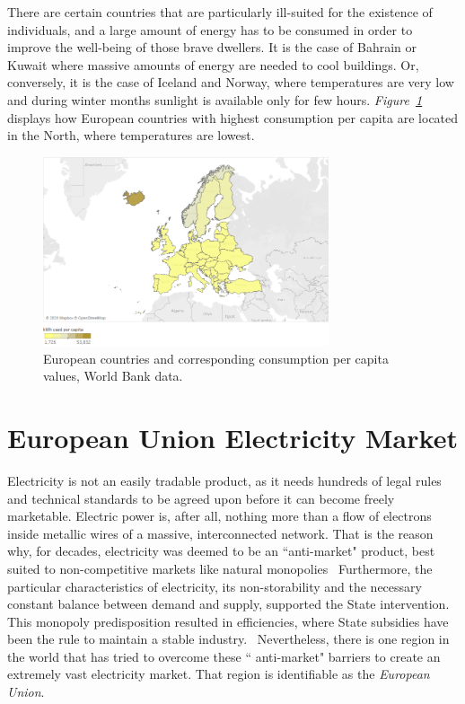 \documentclass[a4paper,12pt]{book}
\begin{document}
There are certain countries that are particularly ill-suited for the existence of individuals, and a large amount of energy has to be consumed in order to improve the well-being of those brave dwellers. It is the case of Bahrain or Kuwait where massive amounts of energy are needed to cool buildings. Or, conversely, it is the case of Iceland and Norway, where temperatures are very low and during winter months sunlight is available only for few hours. \textit{Figure~\ref{fig:conspc}} displays how European countries with highest consumption per capita are located in the North, where temperatures are lowest.

\begin{figure}[tb]
\begin{center}
\captionsetup{justification=centering}
\includegraphics[width=0.75\textwidth]{Images/cons.png}
\caption{European countries and corresponding consumption per capita values, World Bank data. }
\label{fig:conspc}
\end{center}
\end{figure}

\section{European Union Electricity Market}

Electricity is not an easily tradable product, as it needs hundreds of  legal rules and technical standards to be agreed upon before it can become freely marketable. Electric power is, after all, nothing more than a flow of electrons inside metallic wires of a massive, interconnected network. That is the reason why, for decades, electricity was deemed to be an ``anti-market" product, best suited to non-competitive markets like natural monopolies~\cite{glachant2014eu} Furthermore, the particular characteristics of electricity, its non-storability and the necessary constant balance between demand and supply, supported the State intervention. This monopoly predisposition resulted in efficiencies, where State subsidies have been the rule to maintain a stable industry.~\cite{domanico2007concentration} Nevertheless, there is one region in the world that has tried to overcome these `` anti-market" barriers to create an extremely vast electricity market. That region is identifiable as the \textit{European Union}.
\end{document}
